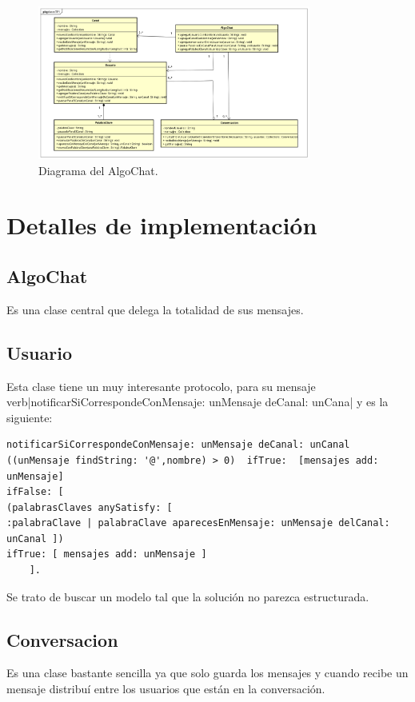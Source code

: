 \documentclass[titlepage,a4paper]{article}
\begin{document}
\begin{figure}[H]
\centering
\includegraphics[width=0.8\textwidth]{DiagramaDeClasesTP1.png}
\caption{\label{fig:class01}Diagrama del AlgoChat.}
\end{figure}

\section{Detalles de implementación}\label{sec:implementacion}

\subsection{AlgoChat}Es una clase central que delega la totalidad de sus mensajes.

\subsection{Usuario} Esta clase tiene un muy interesante protocolo, para su mensaje \\verb|notificarSiCorrespondeConMensaje: unMensaje deCanal: unCana| y es la siguiente:
\begin{verbatim}
notificarSiCorrespondeConMensaje: unMensaje deCanal: unCanal
((unMensaje findString: '@',nombre) > 0)  ifTrue:  [mensajes add: unMensaje] 
ifFalse: [
(palabrasClaves anySatisfy: [ 
:palabraClave | palabraClave aparecesEnMensaje: unMensaje delCanal: unCanal ]) 
ifTrue: [ mensajes add: unMensaje ] 
	]. 
\end{verbatim}
Se trato de buscar un modelo tal que la solución no parezca estructurada.
\subsection{Conversacion} Es una clase bastante sencilla ya que solo guarda los mensajes y cuando recibe un mensaje distribuí entre los usuarios que están en la conversación.
\end{document}
